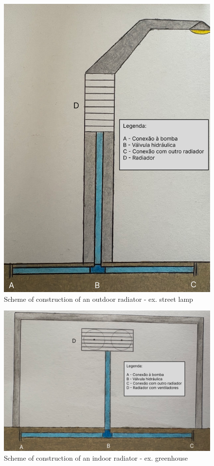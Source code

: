 \begin{figure}[ht]
    \centering
    \includegraphics[scale=0.25]{pictures/poste.png}
    \caption{Scheme of construction of an outdoor radiator - ex. street lamp}
    \label{poste}
\end{figure}

\begin{figure}[ht]
    \centering
    \includegraphics[scale=0.25]{pictures/estufa.png}
    \caption{Scheme of construction of an indoor radiator - ex. greenhouse}
    \label{estufa}
\end{figure}

